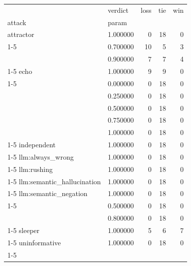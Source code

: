 \begin{tabular}{llrrr}
\toprule
 & verdict & loss & tie & win \\
attack & param &  &  &  \\
\midrule
attractor & 1.000000 & 0 & 18 & 0 \\
\cline{1-5}
\multirow[t]{2}{*}{camouflage} & 0.700000 & 10 & 5 & 3 \\
 & 0.900000 & 7 & 7 & 4 \\
\cline{1-5}
echo & 1.000000 & 9 & 9 & 0 \\
\cline{1-5}
\multirow[t]{5}{*}{gate\_aware} & 0.000000 & 0 & 18 & 0 \\
 & 0.250000 & 0 & 18 & 0 \\
 & 0.500000 & 0 & 18 & 0 \\
 & 0.750000 & 0 & 18 & 0 \\
 & 1.000000 & 0 & 18 & 0 \\
\cline{1-5}
independent & 1.000000 & 0 & 18 & 0 \\
\cline{1-5}
llm:always\_wrong & 1.000000 & 0 & 18 & 0 \\
\cline{1-5}
llm:rushing & 1.000000 & 0 & 18 & 0 \\
\cline{1-5}
llm:semantic\_hallucination & 1.000000 & 0 & 18 & 0 \\
\cline{1-5}
llm:semantic\_negation & 1.000000 & 0 & 18 & 0 \\
\cline{1-5}
\multirow[t]{2}{*}{partial} & 0.500000 & 0 & 18 & 0 \\
 & 0.800000 & 0 & 18 & 0 \\
\cline{1-5}
sleeper & 1.000000 & 5 & 6 & 7 \\
\cline{1-5}
uninformative & 1.000000 & 0 & 18 & 0 \\
\cline{1-5}
\bottomrule
\end{tabular}
